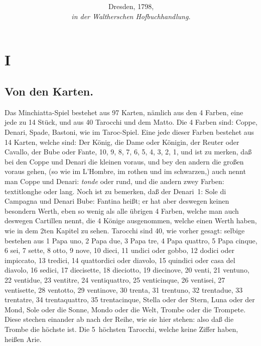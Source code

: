\documentclass[11pt,a6paper,twoside]{article}
\title{\fontshape{sc}\LARGE \textls[180]{Regeln des} \\ \normalsize \textls[1500]{des}\\ \fontsize{34}{34}\selectfont{Minchiatta-Spiels}}
\date{\vfill\small Dresden, 1798, \\ \textit{in der Waltherschen Hofbuchhandlung.}}
\begin{document}
\raggedbottom
{}

\maketitle

\clearpage




\section{I}
\subsection{Von den Karten.}

Das Minchiatta-Spiel bestehet aus 97 Karten, nämlich aus den 4 Farben, eine jede zu 14 Stück, und aus 40 Tarocchi und dem Matto. Die 4 Farben sind: Coppe, Denari, Spade, Bastoni, wie im Taroc-Spiel. Eine jede dieser Farben bestehet aus 14 Karten, welche sind: Der König, die Dame oder Königin, der Reuter oder Cavallo, der Bube oder Fante, 10, 9, 8, 7, 6, 5, 4, 3, 2, 1, und ist zu merken, daß bei den Coppe und Denari die kleinen voraus, und bey den andern die großen voraus gehen, (so wie im L'Hombre, im rothen und im schwarzen,) auch nennt man Coppe und Denari: \mbox{\textit{tonde}} oder rund, und die andern zwey Farben: \mbox{textit{longhe}} oder lang. Noch ist zu bemerken, daß der Denari~1: Sole di Campagna und Denari Bube: Fantina heißt; er hat aber deswegen keinen besondern Werth, eben so wenig als alle übrigen 4 Farben, welche man auch deswegen Cartillen nennt, die 4 Könige ausgenommen, welche einen Werth haben, wie in dem 2ten Kapitel zu sehen. Tarocchi sind 40, wie vorher gesagt: selbige bestehen aus 1 Papa uno, 2 Papa due, 3 Papa tre, 4 Papa quattro, 5 Papa cinque, 6 sei, 7 sette, 8 otto, 9 nove, 10 dieci, 11 undici oder gobbo, 12 dodici oder impiccato, 13 tredici, 14 quattordici oder diavolo, 15 quindici oder casa del diavolo, 16 sedici, 17 diecisette, 18 dieciotto, 19 diecinove, 20 venti, 21 ventuno, 22 ventidue, 23 ventitre, 24 ventiquattro, 25 venticinque, 26 ventisei, 27 ventisette, 28 ventotto, 29 ventinove, 30 trenta, 31 trentuno, 32 trentadue, 33 trentatre, 34 trentaquattro, 35 trentacinque, Stella oder der Stern, Luna oder der Mond, Sole oder die Sonne, Mondo oder die Welt, Trombe oder die Trompete. Diese stechen einander ab nach der Reihe, wie sie hier stehen: also daß die Trombe die höchste ist. Die 5~höchsten Tarocchi, welche keine Ziffer haben, heißen Arie.
\end{document}
